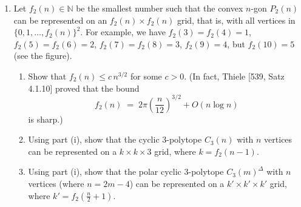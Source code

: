 \documentclass{article}
\begin{document}
\begin{enumerate}
\begin{proof}
    We claim that the convex hull of tangent midpoints must be a regular $n$-gon. In fact, rotate $\mathbb{R}^2$ to let one such tangent point be at $(0,-1)$, then we must have $(-k, -1)$ and $(k, -1)$ as vertices. But then, going along the circle. this uniquely determines where the next vertex must be, because the tangent line is unique and the midpoint condition forces the exact position of the point. (Explicitly, going counterclockwise, we must have the slope of the line as $\frac{2k}{1-k^2}$, and thus the point of intersection as $(\frac{2k}{1+k^2}, -\frac{1-k^2}{k^2+1})$, the point of the new vertex is $(\frac{3k-k^3}{1+k^2}, \frac{2k^2-1}{k^2+1})$.)

    It is easy to see that this implies every edge of the inner $n$-gon must be equal. If the outer $n$-gon closes (i.e. the line between the last vertex and $(-k, -1)$ is tangent to the circle at its midpoint), then the inner $n$-gon is regular. But this means the outer $n$-gon is regular as well, completing the proof.

    If the edges do not necessarily touch $S^1$ with their midpoints, consider the convex hull of the points
    \[(\frac{1}{2},1), (-\frac{1}{2},1), (\frac{1}{2},-1), (-\frac{1}{2},-1), (\frac{5}{4},0), (-\frac{5}{4},0)\]
    who is inscribed by $S^1$ but forms a non-regular hexagon.
\end{proof}

\item Let $f_2(n)\in\mathbb{N}$ be the smallest number such that the convex $n$-gon $P_2(n)$ can be represented on an $f_2(n)\times f_2(n)$ grid, that is, with all vertices in $\{0,1,\dots,f_2(n)\}^2$. For example, we have $f_2(3)=f_2(4)=1$, $f_2(5)=f_2(6)=2$, $f_2(7)=f_2(8)=3$, $f_2(9)=4$, but $f_2(10)=5$ (see the figure).

\begin{enumerate}[label=(\roman*)]
\item Show that $f_2(n)\le c\,n^{3/2}$ for some $c>0$. (In fact, Thiele [539, Satz 4.1.10] proved that the bound
\[f_2(n) \;=\; 2\pi\left(\frac{n}{12}\right)^{3/2} + O(n\log n)\]
is sharp.)

\item Using part (i), show that the cyclic $3$-polytope $C_3(n)$ with $n$ vertices can be represented on a $k\times k\times 3$ grid, where $k=f_2(n-1)$.

\item Using part (i), show that the polar cyclic $3$-polytope $C_3(m)^{\Delta}$ with $n$ vertices (where $n=2m-4$) can be represented on a $k'\times k'\times k'$ grid, where $k' = f_2\!\left(\frac{n}{2}+1\right)$.
\end{enumerate}


\end{enumerate}
\end{document}
